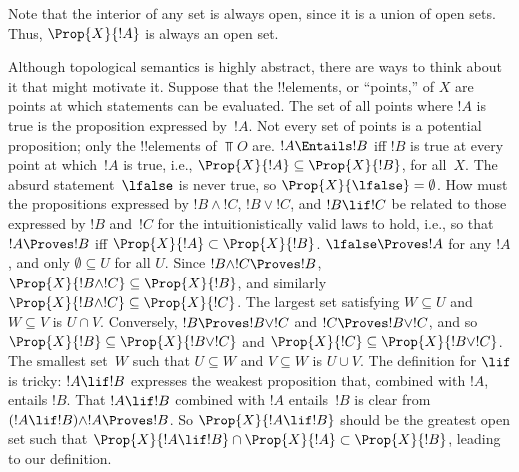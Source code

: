 \documentclass[../../../include/open-logic-section]{subfiles}
\begin{document}
Note that the interior of any set is always open, since it is a union
of open sets. Thus, $\Prop{X}{!A}$ is always an open set.

Although topological semantics is highly abstract, there are ways to
think about it that might motivate it. Suppose that the !!{element}s,
or ``points,'' of $X$ are points at which statements can be
evaluated. The set of all points where $!A$ is true is the proposition
expressed by~$!A$. Not every set of points is a potential proposition;
only the !!{element}s of $\Top{O}$ are.  $!A \Entails !B$ iff $!B$ is
true at every point at which~$!A$ is true, i.e., $\Prop{X}{!A}
\subseteq \Prop{X}{!B}$, for all~$X$. The absurd statement~$\lfalse$
is never true, so $\Prop{X}{\lfalse} = \emptyset$. How must the
propositions expressed by $!B \land !C$, $!B \lor !C$, and $!B \lif
!C$ be related to those expressed by $!B$ and~$!C$ for the
intuitionistically valid laws to hold, i.e., so that $!A \Proves !B$
iff $\Prop{X}{!A} \subset \Prop{X}{!B}$. $\lfalse \Proves !A$ for any
$!A$, and only $\emptyset \subseteq U$ for all $U$.  Since $!B \land
!C \Proves !B$, $\Prop{X}{!B \land !C} \subseteq \Prop{X}{!B}$, and
similarly $\Prop{X}{!B \land !C} \subseteq \Prop{X}{!C}$. The largest
set satisfying $W \subseteq U$ and $W \subseteq V$ is $U \cap V$.
Conversely, $!B \Proves !B \lor !C$ and $!C \Proves !B \lor !C$, and
so $\Prop{X}{!B} \subseteq \Prop{X}{!B \lor !C}$ and $\Prop{X}{!C}
\subseteq \Prop{X}{!B \lor !C}$. The smallest set~$W$ such that $U
\subseteq W$ and $V \subseteq W$ is $U \cup V$.  The definition for
$\lif$ is tricky: $!A \lif !B$ expresses the weakest proposition that,
combined with $!A$, entails $!B$. That $!A \lif !B$ combined with $!A$
entails~$!B$ is clear from $(!A \lif !B) \land !A \Proves !B $. So
$\Prop{X}{!A \lif !B}$ should be the greatest open set such that
$\Prop{X}{!A \lif !B} \cap \Prop{X}{!A} \subset \Prop{X}{!B}$, leading
to our definition.
\end{document}
